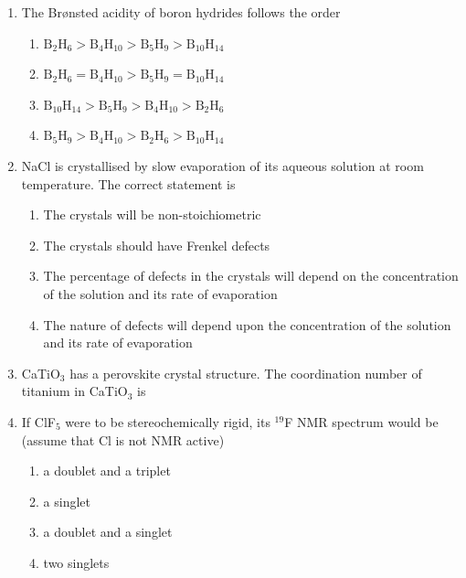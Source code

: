 \documentclass[12pt]{article}
\begin{document}
\begin{enumerate}
\item The Brønsted acidity of boron hydrides follows the order

\begin{enumerate}
    \item $\mathrm{B_2H_6 > B_4H_{10} > B_5H_9 > B_{10}H_{14}}$
    \item $\mathrm{B_2H_6 = B_4H_{10} > B_5H_9 = B_{10}H_{14}}$
    \item $\mathrm{B_{10}H_{14} > B_5H_9 > B_4H_{10} > B_2H_6}$
    \item $\mathrm{B_5H_9 > B_4H_{10} > B_2H_6 > B_{10}H_{14}}$
\end{enumerate}  \hfill{}


\item NaCl is crystallised by slow evaporation of its aqueous solution at room temperature. The correct statement is
\begin{enumerate}
\item  The crystals will be non-stoichiometric
\item  The crystals should have Frenkel defects
\item  The percentage of defects in the crystals will depend on the concentration of the solution and its rate of evaporation
\item  The nature of defects will depend upon the concentration of the solution and its rate of evaporation    \hfill{}
\end{enumerate}


\item CaTiO$_3$ has a perovskite crystal structure. The coordination number of titanium in CaTiO$_3$ is
\begin{enumerate}
 \hfill{}
\end{enumerate}



\item If ClF$_5$ were to be stereochemically rigid, its $^{19}$F NMR spectrum 
 would be (assume that Cl is not NMR active)
\begin{enumerate}
\item a doublet and a triplet
\item a singlet
\item  a doublet and a singlet
\item two singlets    \hfill{}
\end{enumerate}



\end{enumerate}
\end{document}
